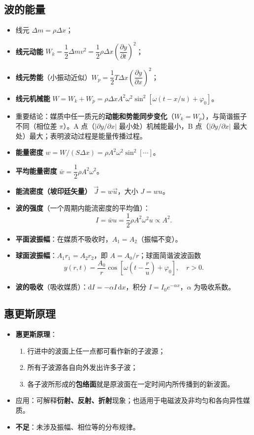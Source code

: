 \documentclass[12pt,a4paper]{ctexart}
\begin{document}
\subsection{波的能量}

\begin{itemize}
    \item 线元 $\Delta m = \rho\Delta x$；
    \item \textbf{线元动能} $W_k = \dfrac{1}{2}\Delta m v^2 = \dfrac{1}{2}\rho\Delta x\!\left(\dfrac{\partial y}{\partial t}\right)^2$；
    \item \textbf{线元势能}（小振动近似）$W_p = \dfrac{1}{2}T\Delta x\!\left(\dfrac{\partial y}{\partial x}\right)^2$；
    \item \textbf{线元机械能} $W = W_k+W_p = \rho\Delta x A^2\omega^2\sin^2\!\left[\omega(t-x/u)+\varphi_0\right]$。
    \item 重要结论：媒质中任一质元的\textbf{动能和势能同步变化}（$W_k=W_p$），与简谐振子不同（相位差 $\pi$）。A 点（$|\partial y/\partial x|$ 最小处）机械能最小，B 点（$|\partial y/\partial x|$ 最大处）最大；表明波动过程是能量传播过程。
    \item \textbf{能量密度} $w = W/(S\Delta x) = \rho A^2\omega^2\sin^2[\cdots]$。
    \item \textbf{平均能量密度} $\bar w = \dfrac{1}{2}\rho A^2\omega^2$。
    \item \textbf{能流密度（坡印廷矢量）} $\vec J = w\vec u$，大小 $J = wu$。
    \item \textbf{波的强度}（一个周期内能流密度的平均值）：
    \[
        I = \bar wu = \frac{1}{2}\rho A^2\omega^2 u \propto A^2.
    \]
    \item \textbf{平面波振幅}：在媒质不吸收时，$A_1 = A_2$（振幅不变）。
    \item \textbf{球面波振幅}：$A_1r_1 = A_2r_2$，即 $A = A_0/r$；球面简谐波波函数
    \[
        y(r,t) = \frac{A_0}{r}\cos\!\left[\omega\!\left(t-\frac{r}{u}\right)+\varphi_0\right],\quad r>0.
    \]
    \item \textbf{波的吸收}（吸收媒质）：$\mathrm{d}I = -\alpha I\,\mathrm{d}x$，积分 $I = I_0 e^{-\alpha x}$，$\alpha$ 为吸收系数。
\end{itemize}

\subsection{惠更斯原理}

\begin{itemize}
    \item \textbf{惠更斯原理}：
    \begin{enumerate}
        \item 行进中的波面上任一点都可看作新的子波源；
        \item 所有子波源各自向外发出许多子波；
        \item 各子波所形成的\textbf{包络面}就是原波面在一定时间内所传播到的新波面。
    \end{enumerate}
    \item 应用：可解释\textbf{衍射、反射、折射}现象；也适用于电磁波及非均匀和各向异性媒质。
    \item \textbf{不足}：未涉及振幅、相位等的分布规律。
\end{itemize}
\end{document}
